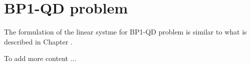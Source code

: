 \section{BP1-QD problem}

The formulation of the linear systme for BP1-QD problem is similar to what is described in Chapter \label{chap:matrix-free}.

To add more content ...